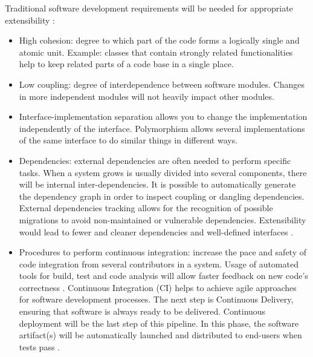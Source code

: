 \documentclass[12pt,english]{article} %
\begin{document}
Traditional software development requirements will be needed for appropriate extensibility \cite{philosophy-extensible-software}:
\begin{itemize}
    \item High cohesion: degree to which part of the code forms a logically single and atomic unit.
    Example: classes that contain strongly related functionalities help to keep related parts of a code base in a single place. %
    \item Low coupling: degree of interdependence between software modules. %
    Changes in more independent modules will not heavily impact other modules. %
    \item Interface-implementation separation allows you to change the implementation independently of the interface. 
    Polymorphism allows several implementations of the same interface to do similar things in different ways. %
    \item Dependencies: external dependencies are often needed to perform specific tasks.
    When a system grows is usually divided into several components, there will be internal inter-dependencies.
    It is possible to automatically generate the dependency graph in order to inspect coupling or dangling dependencies. External dependencies tracking allows for the recognition of possible migrations to avoid non-maintained or vulnerable dependencies.
    Extensibility would lead to fewer and cleaner dependencies and well-defined interfaces \cite{philosophy-extensible-software}.
    \item Procedures to perform continuous integration: increase the pace and safety of code integration from several contributors in a system.
    Usage of automated tools for build, test and code analysis will allow faster feedback on new code’s correctness \cite{what-is-continuous-integration}.
    Continuous Integration (CI) helps to achieve agile approaches for software development processes.
    The next step is Continuous Delivery, ensuring that software is always ready to be delivered.
    Continuous deployment will be the last step of this pipeline.
    In this phase, the software artifact(s) will be automatically launched and distributed to end-users when tests pass \cite{what-is-continuous-integration}.
\end{itemize}
\end{document}
